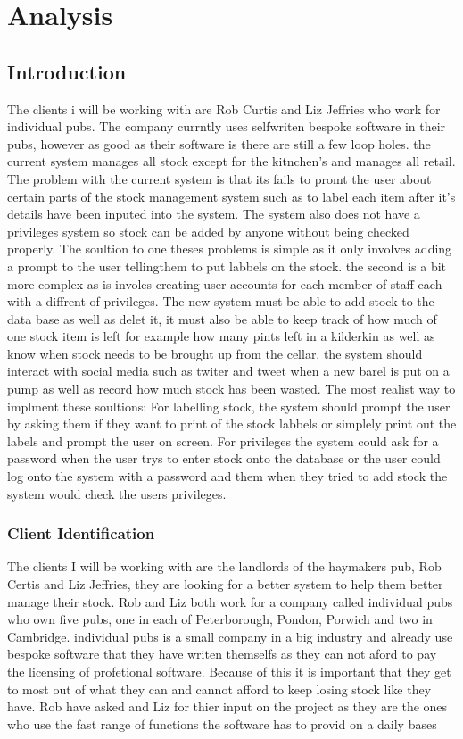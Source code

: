 \chapter{Analysis}

\section{Introduction}
The clients i will be working with are Rob Curtis and Liz Jeffries who work for individual pubs. The company currntly uses selfwriten bespoke software in their pubs, however as good as their software is there are still a few loop holes. the current system manages all stock except for the kitnchen's and manages all retail. 
The problem with the current system is that its fails to promt the user about certain parts of the stock management system such as to label each item after it's details have been inputed into the system. The system also does not have a privileges system so stock can be added by anyone without being checked properly. The soultion to one theses problems is simple as it only involves adding a prompt to the user tellingthem to put labbels on the stock. the second is a bit more complex as is involes creating user accounts for each member of staff each with a diffrent of privileges.
The new system must be able to add stock to the data base as well as delet it, it must also be able to keep track of how much of one stock item is left for example how many pints left in a kilderkin as well as know when stock needs to be brought up from the cellar. the system should interact with social media such as twiter and tweet when a new barel is put on a pump as well as record how much stock has been wasted.
The most realist way to implment these soultions: For labelling stock, the system should prompt the user by asking them if they want to print of the stock labbels or simplely print out the labels and prompt the user on screen. For privileges the system could ask for a password when the user trys to enter stock onto the database or the user could log onto the system with a password and them when they tried to add stock the system would check the users privileges.
\subsection{Client Identification}
The clients I will be working with are the landlords of the haymakers pub, Rob Certis and Liz Jeffries, they are looking for a better system to help them better manage their stock. Rob and Liz both work for a company called individual pubs who own five pubs, one in each of Peterborough, Pondon, Porwich and two in Cambridge. individual pubs is a small company in a big industry and already use bespoke software that they have writen themselfs as they can not aford to pay the licensing of profetional software. Because of this it is important that they get to most out of what they can and cannot afford to keep losing stock like they have. Rob have asked and Liz for thier input on the project as they are the ones who use the fast range of functions the software has to provid on a daily bases
